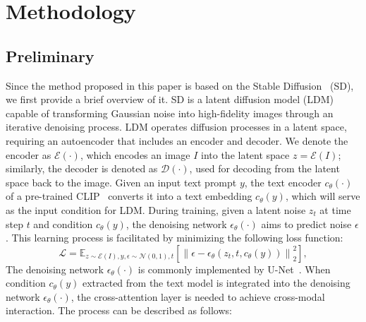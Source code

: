 \section{Methodology}
\label{sec:Methodology}

\subsection{Preliminary}
Since the method proposed in this paper is based on the Stable Diffusion~\cite{rombach2022high} (SD), we first provide a brief overview of it. SD is a latent diffusion model (LDM) capable of transforming Gaussian noise into high-fidelity images through an iterative denoising process. LDM operates diffusion processes in a latent space, requiring an autoencoder that includes an encoder and decoder. We denote the encoder as $\mathcal{E}(\cdot)$, which encodes an image $I$ into the latent space $z=\mathcal{E}(I)$; similarly, the decoder is denoted as $\mathcal{D}(\cdot)$, used for decoding from the latent space back to the image. Given an input text prompt $y$, the text encoder $c_{\theta}(\cdot)$ of a pre-trained CLIP~\cite{radford2021learning} converts it into a text embedding $c_{\theta}(y)$, which will serve as the input condition for LDM. During training, given a latent noise $z_{t}$ at time step $t$ and condition $c_{\theta}(y)$, the denoising network $\epsilon_{\theta}(\cdot)$ aims to predict noise $\epsilon$. This learning process is facilitated by minimizing the following loss function:
\begin{equation}
\mathcal{L}=\mathbb{E}_{z \sim \mathcal{E}(I), y, \epsilon \sim \mathcal{N}(0,1), t}\left[\left\|\epsilon-\epsilon_\theta\left(z_t, t, c_{\theta}(y)\right)\right\|_2^2\right],\label{eq1}
\end{equation}
The denoising network $\epsilon_{\theta}(\cdot)$ is commonly implemented by U-Net~\cite{ronneberger2015u}. When condition $c_{\theta}(y)$ extracted from the text model is integrated into the denoising network $\epsilon_{\theta}(\cdot)$, the cross-attention layer is needed to achieve cross-modal interaction. The process can be described as follows:
